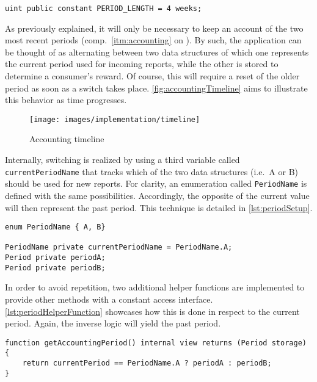 \begin{lstlisting}[caption=Definition of period length, label=lst:periodLength]
uint public constant PERIOD_LENGTH = 4 weeks;
\end{lstlisting}

As previously explained, it will only be necessary to keep an account of the two most recent periods (comp.~\ref{itm:accounting} on ). By such, the application can be thought of as alternating between two data structures of which one represents the current period used for incoming reports, while the other is stored to determine a consumer's reward. Of course, this will require a reset of the older period as soon as a switch takes place. \autoref{fig:accountingTimeline} aims to illustrate this behavior as time progresses. 

\begin{figure}[hbt]
	  \texttt{[image: images/implementation/timeline]}
	  \caption{Accounting timeline}
	  \label{fig:accountingTimeline}
\end{figure}

\FloatBarrier

Internally, switching is realized by using a third variable called \texttt{currentPeriodName} that tracks which of the two data structures (i.e.~A or B) should be used for new reports. For clarity, an enumeration called \texttt{PeriodName} is defined with the same possibilities. Accordingly, the opposite of the current value will then represent the past period. This technique is detailed in \autoref{lst:periodSetup}. 

\begin{lstlisting}[language=Solidity, caption=Declaration of periods and definition of current period tracker, label=lst:periodSetup]
enum PeriodName { A, B}

PeriodName private currentPeriodName = PeriodName.A;
Period private periodA;
Period private periodB;
\end{lstlisting}

In order to avoid repetition, two additional helper functions are implemented to provide other methods with a constant access interface.  \autoref{lst:periodHelperFunction} showcases how this is done in respect to the current period. Again, the inverse logic will yield the past period. 

\begin{lstlisting}[language=Solidity, caption=Helper function to retrieve current period, label=lst:periodHelperFunction]
function getAccountingPeriod() internal view returns (Period storage) {
	return currentPeriod == PeriodName.A ? periodA : periodB;
}
\end{lstlisting}
 
